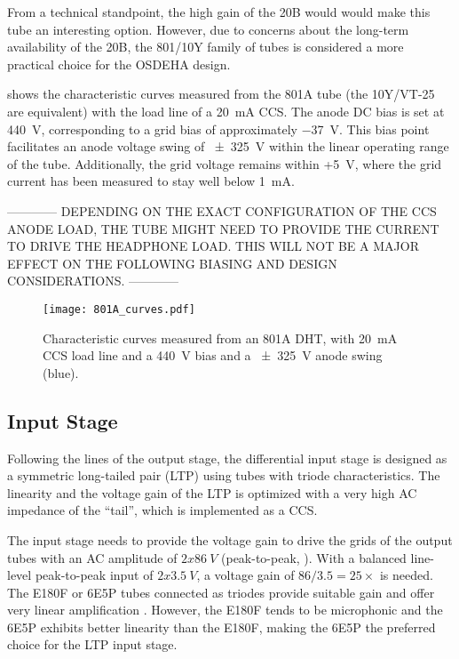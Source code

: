 From a technical standpoint, the high gain of the 20B would would make this tube an interesting option. However, due to concerns about the long-term availability of the 20B, the 801/10Y family of tubes is considered a more practical choice for the OSDEHA design.

 shows the characteristic curves measured from the 801A tube (the 10Y/VT-25 are equivalent) with the load line of a \SI{20}{mA} CCS. The anode DC bias is set at \SI{440}{V}, corresponding to a grid bias of approximately \SI{-37}{V}. This bias point facilitates an anode voltage swing of \SI{\pm325}{V} within the linear operating range of the tube. Additionally, the grid voltage remains within +\SI{5}{V}, where the grid current has been measured to stay well below \SI{1}{mA}.

------------
DEPENDING ON THE EXACT CONFIGURATION OF THE CCS ANODE LOAD, THE TUBE MIGHT NEED TO PROVIDE THE CURRENT TO DRIVE THE HEADPHONE LOAD. THIS WILL NOT BE A MAJOR EFFECT ON THE FOLLOWING BIASING AND DESIGN CONSIDERATIONS.
------------


\begin{figure}
\begin{center}
\texttt{[image: 801A\_curves.pdf]}
\caption{Characteristic curves measured from an 801A DHT, with \SI{20}{mA} CCS load line and a \SI{440}{V} bias and a \SI{\pm325}{V} anode swing (blue).}
\end{center}
\end{figure}


\subsection{Input Stage}

Following the lines of the output stage, the differential input stage is designed as a symmetric long-tailed pair (LTP)\cite{valvewizard_LTP} using tubes with triode characteristics. The linearity and the voltage gain of the LTP is optimized with a very high AC impedance of the ``tail'', which is implemented as a CCS.

The input stage needs to provide the voltage gain to drive the grids of the output tubes with an AC amplitude of $2 x \SI{86}{V}$ (peak-to-peak, ). With a balanced line-level peak-to-peak input of $2 x \SI{3.5}{V}$, a voltage gain of $86 / 3.5 = 25\times$ is needed. The E180F or 6E5P tubes connected as triodes provide suitable gain and offer very linear amplification \cite{bartola_thdbenchmark,millett_pentodes,klausmobile_testerfiles}. However, the E180F tends to be microphonic\cite{osdeha_p23} and the 6E5P exhibits better linearity than the E180F\cite{osdeha_p32}, making the 6E5P the preferred choice for the LTP input stage.



